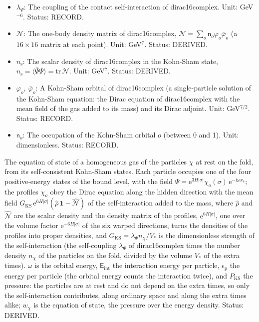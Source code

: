 \documentclass[
  10pt,
]{article}
\begin{document}
\begin{itemize}
  \(V_*\); normalised to the Krein charge \(-1\),
  \(\int\mathrm{d}\sigma\,\chi_o^\dagger\mathfrak{B}\chi_o = -1\);
  \(\bar\chi_o = \chi_o^\dagger\sigma_{16}\) is its Dirac adjoint. Unit:
  GeV\(^{1/2}\). Status: DERIVED.
\item
  \(\lambda_\Psi\): The coupling of the contact self-interaction of
  dirac16complex. Unit: GeV\(^{-6}\). Status: RECORD.
\item
  \(\mathcal{N}\): The one-body density matrix of dirac16complex,
  \(\mathcal{N} = \sum_o\mathsf{n}_o\varphi_o\bar\varphi_o\) (a
  \(16 \times 16\) matrix at each point). Unit: GeV\(^7\). Status:
  DERIVED.
\item
  \(n_{\mathrm{s}}\): The scalar density of dirac16complex in the
  Kohn-Sham state,
  \(n_{\mathrm{s}} = \langle\bar\Psi\Psi\rangle = \mathrm{tr}\,\mathcal{N}\).
  Unit: GeV\(^7\). Status: DERIVED.
\item
  \(\varphi_o,\ \bar\varphi_o\): A Kohn-Sham orbital of dirac16complex
  (a single-particle solution of the Kohn-Sham equation: the Dirac
  equation of dirac16complex with the mean field of the gas added to its
  mass) and its Dirac adjoint. Unit: GeV\(^{7/2}\). Status: RECORD.
\item
  \(\mathsf{n}_o\): The occupation of the Kohn-Sham orbital \(o\)
  (between 0 and 1). Unit: dimensionless. Status: RECORD.
\end{itemize}

The equation of state of a homogeneous gas of the particles \(\chi\) at
rest on the fold, from its self-consistent Kohn-Sham states. Each
particle occupies one of the four positive-energy states of the bound
level, with the field
\(\Psi = \mathrm{e}^{3H\lvert\sigma\rvert}\chi_o(\sigma)\,\mathrm{e}^{-\mathrm{i}\omega x_4}\);
the profiles \(\chi_o\) obey the Dirac equation along the hidden
direction with the mean field
\(G_{\mathrm{KS}}\,\mathrm{e}^{6H\lvert\sigma\rvert}(\hat\rho\,\mathbf{1} - \hat{\mathcal{N}})\)
of the self-interaction added to the mass, where \(\hat\rho\) and
\(\hat{\mathcal{N}}\) are the scalar density and the density matrix of
the profiles, \(\mathrm{e}^{6H\lvert\sigma\rvert}\), one over the volume
factor \(\mathrm{e}^{-6H\lvert\sigma\rvert}\) of the six warped
directions, turns the densities of the profiles into proper densities,
and \(G_{\mathrm{KS}} = \lambda_\Psi n_\chi/V_*\) is the dimensionless
strength of the self-interaction (the self-coupling \(\lambda_\Psi\) of
dirac16complex times the number density \(n_\chi\) of the particles on
the fold, divided by the volume \(V_*\) of the extra times). \(\omega\)
is the orbital energy, \(\mathsf{E}_{\mathrm{int}}\) the interaction
energy per particle, \(\epsilon_{\mathrm{p}}\) the energy per particle
(the orbital energy counts the interaction twice), and
\(P_{\mathrm{KS}}\) the pressure: the particles are at rest and do not
depend on the extra times, so only the self-interaction contributes,
along ordinary space and along the extra times alike; \(w_\chi\) is the
equation of state, the pressure over the energy density. Status:
DERIVED.
\end{document}
